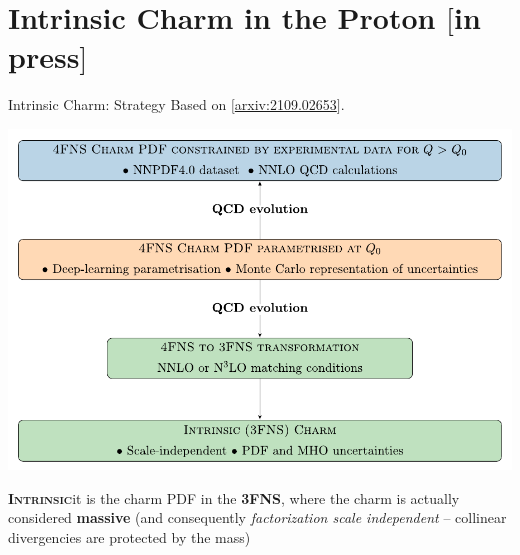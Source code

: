 \documentclass[9pt]{beamer}
\providecommand{\iRef}[1]{{\color{mLightGreen}\small $[$#1$]$}}
\begin{document}
\section{Intrinsic Charm in the Proton \iRef{in press}}

\begin{frame}{Intrinsic Charm: Strategy}
    Based on  \iRef{\href{https://arxiv.org/abs/2109.02653}{arxiv:2109.02653}}.

    \begin{center}
        \includegraphics[scale=.6]{strategy}
    \end{center}

    \textsc{\textbf{Intrinsic}}\quad it is the charm PDF in the \textbf{3FNS},
    where the charm is actually considered \alert{\textbf{massive}}
    {\footnotesize (and consequently \textit{factorization scale independent}
    -- collinear divergencies are protected by the mass)}
\end{frame}
\end{document}
